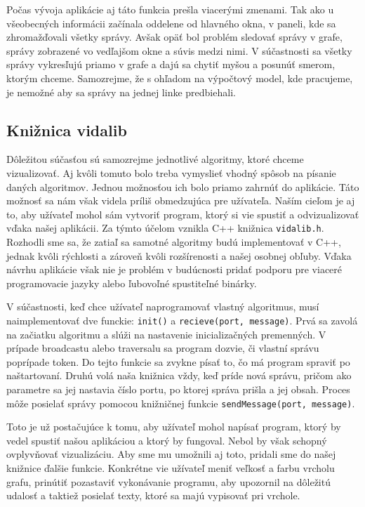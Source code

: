 Počas vývoja aplikácie aj táto funkcia prešla viacerými zmenami. Tak ako u všeobecných informácii
začínala oddelene od hlavného okna, v paneli, kde sa zhromažďovali všetky správy.
Avšak opäť bol problém sledovať správy v grafe, správy zobrazené vo vedľajšom okne a súvis medzi
nimi. V súčastnosti sa všetky správy vykresľujú priamo v grafe a dajú sa chytiť myšou a posunúť
smerom, ktorým chceme. Samozrejme, že s ohľadom na výpočtový model, kde pracujeme, je
nemožné aby sa správy na jednej linke predbiehali.

\subsection{Knižnica vidalib}

Dôležitou súčasťou sú samozrejme jednotlivé algoritmy, ktoré chceme vizualizovať. Aj kvôli tomuto bolo
treba vymyslieť vhodný spôsob na písanie daných algoritmov. Jednou možnosťou ich bolo priamo zahrnúť
do aplikácie. Táto možnosť sa nám však videla príliš obmedzujúca pre užívateľa. Naším cieľom je aj
to, aby užívateľ mohol sám vytvoriť program, ktorý si vie spustiť a odvizualizovať vďaka našej
aplikácii. Za týmto účelom vznikla C++ knižnica \verb!vidalib.h!. Rozhodli sme sa, že zatiaľ sa samotné
algoritmy budú implementovať v C++, jednak kvôli rýchlosti a zároveň kvôli rozšírenosti a našej
osobnej obľuby. Vďaka návrhu aplikácie však nie je problém v budúcnosti pridať podporu pre viaceré
programovacie jazyky alebo ľubovoľné spustiteľné binárky.

V súčastnosti, keď chce užívateľ naprogramovať vlastný algoritmus, musí naimplementovať dve funckie: \verb!init()! a
\verb!recieve(port, message)!. Prvá sa zavolá na začiatku algoritmu a slúži na nastavenie
inicializačných premenných. V prípade broadcastu alebo traversalu sa program dozvie, či vlastní správu poprípade token.
Do tejto funkcie sa zvykne písať to, čo má program spraviť po naštartovaní.
Druhú volá naša knižnica vždy, keď príde nová správu, pričom ako parametre sa jej nastavia číslo
portu, po ktorej správa prišla a jej obsah. Proces môže posielať správy pomocou knižničnej
funkcie \verb!sendMessage(port, message)!.

Toto je už postačujúce k tomu, aby užívateľ mohol napísať program, ktorý by vedel spustiť našou
aplikáciou a ktorý by fungoval. Nebol by však schopný ovplyvňovať vizualizáciu. Aby sme mu umožnili
aj toto, pridali sme do našej knižnice ďalšie funkcie. Konkrétne vie užívateľ meniť veľkosť a farbu
vrcholu grafu, prinútiť pozastaviť vykonávanie programu, aby upozornil na dôležitú udalosť a
taktiež posielať texty, ktoré sa majú vypisovať pri vrchole.

